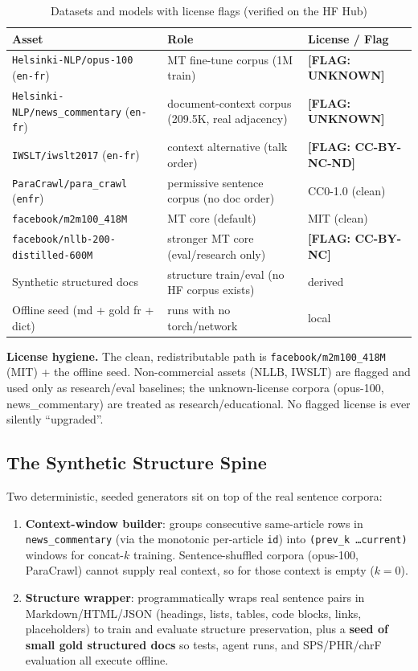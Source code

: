 \documentclass[12pt,a4paper]{article}
\begin{document}
\begin{table}[H]
\centering
\caption{Datasets and models with license flags (verified on the HF Hub)}
\small
\begin{tabularx}{\linewidth}{@{} l l l @{}}
\toprule
\textbf{Asset} & \textbf{Role} & \textbf{License / Flag} \\
\midrule
\texttt{Helsinki-NLP/opus-100} (\texttt{en-fr}) & MT fine-tune corpus (1M train) & \textbf{[FLAG: UNKNOWN]} \\
\texttt{Helsinki-NLP/news\_commentary} (\texttt{en-fr}) & document-context corpus (209.5K, real adjacency) & \textbf{[FLAG: UNKNOWN]} \\
\texttt{IWSLT/iwslt2017} (\texttt{en-fr}) & context alternative (talk order) & \textbf{[FLAG: CC-BY-NC-ND]} \\
\texttt{ParaCrawl/para\_crawl} (\texttt{enfr}) & permissive sentence corpus (no doc order) & CC0-1.0 (clean) \\
\texttt{facebook/m2m100\_418M} & MT core (default) & MIT (clean) \\
\texttt{facebook/nllb-200-distilled-600M} & stronger MT core (eval/research only) & \textbf{[FLAG: CC-BY-NC]} \\
Synthetic structured docs & structure train/eval (no HF corpus exists) & derived \\
Offline seed (md + gold fr + dict) & runs with no torch/network & local \\
\bottomrule
\end{tabularx}
\end{table}

\textbf{License hygiene.} The clean, redistributable path is \texttt{facebook/m2m100\_418M} (MIT) + the offline seed. Non-commercial assets (NLLB, IWSLT) are flagged and used only as research/eval baselines; the unknown-license corpora (opus-100, news\_commentary) are treated as research/educational. No flagged license is ever silently ``upgraded''.

\subsection{The Synthetic Structure Spine}

Two deterministic, seeded generators sit on top of the real sentence corpora:
\begin{enumerate}
  \item \textbf{Context-window builder}: groups consecutive same-article rows in \texttt{news\_commentary} (via the monotonic per-article \texttt{id}) into \texttt{(prev\_k \dots current)} windows for concat-$k$ training. Sentence-shuffled corpora (opus-100, ParaCrawl) cannot supply real context, so for those context is empty ($k=0$).
  \item \textbf{Structure wrapper}: programmatically wraps real sentence pairs in Markdown/HTML/JSON (headings, lists, tables, code blocks, links, placeholders) to train and evaluate structure preservation, plus a \textbf{seed of small gold structured docs} so tests, agent runs, and SPS/PHR/chrF evaluation all execute offline.
\end{enumerate}
\end{document}
